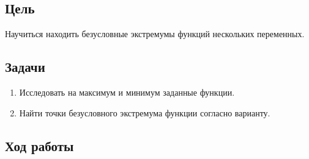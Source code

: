 


        
\newcommand{\labn}{5}


\subsection*{Цель}

Научиться находить безусловные экстремумы функций нескольких переменных.

\subsection*{Задачи}

\begin{enumerate}
    \item Исследовать на максимум и минимум заданные функции.
    \item Найти точки безусловного экстремума функции согласно варианту.
\end{enumerate}

\subsection*{Ход работы}

